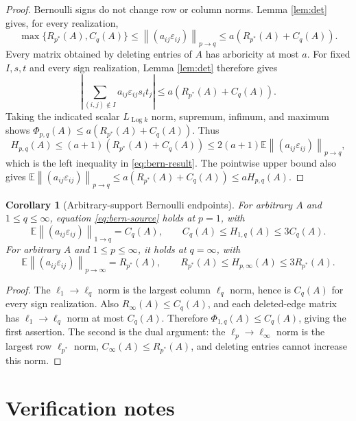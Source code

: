 \documentclass[11pt]{article}
\newtheorem{corollary}[theorem]{Corollary}
\theoremstyle{definition}
\theoremstyle{remark}
\newcommand{\E}{\mathbb E}
\newcommand{\eps}{\varepsilon}
\newcommand{\Log}{\operatorname{Log}}
\newcommand{\opnorm}[1]{\left\lVert #1\right\rVert}
\begin{document}
\begin{proof}
Bernoulli signs do not change row or column norms.  Lemma \ref{lem:det} gives,
for every realization,
\[
 \max\{R_{p^*}(A),C_q(A)\}
 \le\opnorm{(a_{ij}\eps_{ij})}_{p\to q}
 \le a(R_{p^*}(A)+C_q(A)).
\]
Every matrix obtained by deleting entries of $A$ has arboricity at most $a$.
For fixed $I,s,t$ and every sign realization, Lemma \ref{lem:det} therefore
gives
\[
 \left|\sum_{(i,j)\notin I}a_{ij}\eps_{ij}s_it_j\right|
 \le a(R_{p^*}(A)+C_q(A)).
\]
Taking the indicated scalar $L_{\Log k}$ norm, supremum, infimum, and maximum
shows
$\Phi_{p,q}(A)\le a(R_{p^*}(A)+C_q(A))$.
Thus
\[
 H_{p,q}(A)\le(a+1)(R_{p^*}(A)+C_q(A))
 \le2(a+1)\E\opnorm{(a_{ij}\eps_{ij})}_{p\to q},
\]
which is the left inequality in \eqref{eq:bern-result}.  The pointwise upper
bound also gives
$\E\opnorm{(a_{ij}\eps_{ij})}_{p\to q}
\le a(R_{p^*}(A)+C_q(A))\le aH_{p,q}(A)$.
\end{proof}

\begin{corollary}[Arbitrary-support Bernoulli endpoints]\label{cor:endpoints}
For arbitrary $A$ and $1\le q\le\infty$, equation
\eqref{eq:bern-source} holds at $p=1$, with
\[
 \E\opnorm{(a_{ij}\eps_{ij})}_{1\to q}=C_q(A),\qquad
 C_q(A)\le H_{1,q}(A)\le3C_q(A).
\]
For arbitrary $A$ and $1\le p\le\infty$, it holds at $q=\infty$, with
\[
 \E\opnorm{(a_{ij}\eps_{ij})}_{p\to\infty}=R_{p^*}(A),\qquad
 R_{p^*}(A)\le H_{p,\infty}(A)\le3R_{p^*}(A).
\]
\end{corollary}

\begin{proof}
The $\ell_1\to\ell_q$ norm is the largest column $\ell_q$ norm, hence is
$C_q(A)$ for every sign realization.  Also $R_\infty(A)\le C_q(A)$, and each
deleted-edge matrix has $\ell_1\to\ell_q$ norm at most $C_q(A)$.  Therefore
$\Phi_{1,q}(A)\le C_q(A)$, giving the first assertion.  The second is the dual
argument: the $\ell_p\to\ell_\infty$ norm is the largest row $\ell_{p^*}$ norm,
$C_\infty(A)\le R_{p^*}(A)$, and deleting entries cannot increase this norm.
\end{proof}

\section{Verification notes}
\end{document}
